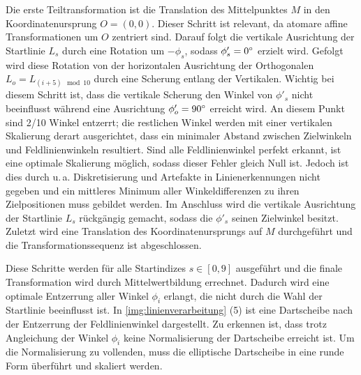 Die erste Teiltransformation ist die Translation des Mittelpunktes $M$ in den Koordinatenursprung $O =(0, 0)$. Dieser Schritt ist relevant, da atomare affine Transformationen um $O$ zentriert sind. Darauf folgt die vertikale Ausrichtung der Startlinie $L_s$ durch eine Rotation um $-\phi_s$, sodass $\phi'_s = 0^{\circ}$ erzielt wird. Gefolgt wird diese Rotation von der horizontalen Ausrichtung der Orthogonalen $L_o = L_{(i+5) \mod 10}$ durch eine Scherung entlang der Vertikalen. Wichtig bei diesem Schritt ist, dass die vertikale Scherung den Winkel von $\phi'_s$ nicht beeinflusst während eine Ausrichtung $\phi'_o = 90^{\circ}$ erreicht wird. An diesem Punkt sind 2/10 Winkel entzerrt; die restlichen Winkel werden mit einer vertikalen Skalierung derart ausgerichtet, dass ein minimaler Abstand zwischen Zielwinkeln und Feldlinienwinkeln resultiert. Sind alle Feldlinienwinkel perfekt erkannt, ist eine optimale Skalierung möglich, sodass dieser Fehler gleich Null ist. Jedoch ist dies durch u.\,a. Diskretisierung und Artefakte in Linienerkennungen nicht gegeben und ein mittleres Minimum aller Winkeldifferenzen zu ihren Zielpositionen muss gebildet werden. Im Anschluss wird die vertikale Ausrichtung der Startlinie $L_s$ rückgängig gemacht, sodass die $\phi'_s$ seinen Zielwinkel besitzt. Zuletzt wird eine Translation des Koordinatenursprungs auf $M$ durchgeführt und die Transformationssequenz ist abgeschlossen.

Diese Schritte werden für alle Startindizes $s \in [0, 9]$ ausgeführt und die finale Transformation wird durch Mittelwertbildung errechnet. Dadurch wird eine optimale Entzerrung aller Winkel $\phi_i$ erlangt, die nicht durch die Wahl der Startlinie beeinflusst ist. In \autoref{img:linienverarbeitung} (5) ist eine Dartscheibe nach der Entzerrung der Feldlinienwinkel dargestellt. Zu erkennen ist, dass trotz Angleichung der Winkel $\phi_i$ keine Normalisierung der Dartscheibe erreicht ist. Um die Normalisierung zu vollenden, muss die elliptische Dartscheibe in eine runde Form überführt und skaliert werden.


